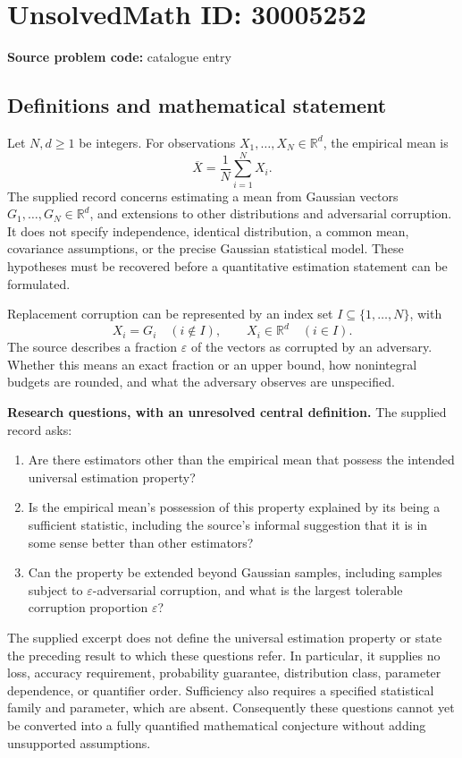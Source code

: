\documentclass[11pt]{article}
\newcommand{\R}{\mathbb{R}}
\begin{document}
\section*{UnsolvedMath ID: 30005252}
\textbf{Source problem code:} catalogue entry
\subsection{Definitions and mathematical statement}
Let \(N,d\geq 1\) be integers. For observations \(X_1,\ldots,X_N\in\R^d\), the empirical mean is
\[
\overline X=\frac1N\sum_{i=1}^N X_i.
\]
The supplied record concerns estimating a mean from Gaussian vectors \(G_1,\ldots,G_N\in\R^d\), and extensions to other distributions and adversarial corruption. It does not specify independence, identical distribution, a common mean, covariance assumptions, or the precise Gaussian statistical model. These hypotheses must be recovered before a quantitative estimation statement can be formulated.

Replacement corruption can be represented by an index set \(I\subseteq\{1,\ldots,N\}\), with
\[
X_i=G_i\quad(i\notin I),\qquad X_i\in\R^d\quad(i\in I).
\]
The source describes a fraction \(\varepsilon\) of the vectors as corrupted by an adversary. Whether this means an exact fraction or an upper bound, how nonintegral budgets are rounded, and what the adversary observes are unspecified.

\textbf{Research questions, with an unresolved central definition.} The supplied record asks:
\begin{enumerate}
\item Are there estimators other than the empirical mean that possess the intended universal estimation property?
\item Is the empirical mean's possession of this property explained by its being a sufficient statistic, including the source's informal suggestion that it is in some sense better than other estimators?
\item Can the property be extended beyond Gaussian samples, including samples subject to \(\varepsilon\)-adversarial corruption, and what is the largest tolerable corruption proportion \(\varepsilon\)?
\end{enumerate}
The supplied excerpt does not define the universal estimation property or state the preceding result to which these questions refer. In particular, it supplies no loss, accuracy requirement, probability guarantee, distribution class, parameter dependence, or quantifier order. Sufficiency also requires a specified statistical family and parameter, which are absent. Consequently these questions cannot yet be converted into a fully quantified mathematical conjecture without adding unsupported assumptions.
\end{document}

